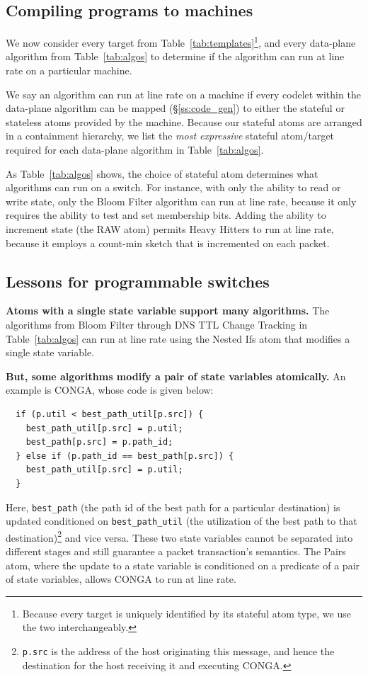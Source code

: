 \subsection{Compiling \pktlanguage programs to \absmachine machines}
\label{ss:compiler}
We now consider every target from Table~\ref{tab:templates}\footnote{Because
every target is uniquely identified by its stateful atom type, we use the two
interchangeably.}, and every data-plane algorithm from Table~\ref{tab:algos} to
determine if the algorithm can run at line rate on a particular \absmachine
machine.

We say an algorithm can run at line rate on a \absmachine machine if every
codelet within the data-plane algorithm can be mapped (\S\ref{ss:code_gen}) to
either the stateful or stateless atoms provided by the \absmachine machine.
Because our stateful atoms are arranged in a containment hierarchy, we list the
\textit{most expressive} stateful atom/target required for each data-plane
algorithm in Table~\ref{tab:algos}.

As Table~\ref{tab:algos} shows, the choice of stateful atom determines
 what algorithms can run on a switch. For instance, with only the
ability to read or write state, only the Bloom Filter algorithm can run at line
rate, because it only requires the ability to test and set membership bits.
Adding the ability to increment state (the RAW atom) permits Heavy
Hitters to run at line rate, because it employs a count-min sketch that is
incremented on each packet.

\subsection{Lessons for programmable switches}
\label{ss:lessons}

\medskip
\noindent
\textbf{Atoms with a single state variable support many algorithms.}
The algorithms from Bloom Filter through DNS TTL Change Tracking
in Table~\ref{tab:algos} can run at line rate using the Nested Ifs atom that
modifies a single state variable.

\medskip
\noindent
\textbf{But, some algorithms modify a pair of state variables atomically.}
An example is CONGA, whose code is given below:
\begin{verbatim}
  if (p.util < best_path_util[p.src]) {
    best_path_util[p.src] = p.util;
    best_path[p.src] = p.path_id;
  } else if (p.path_id == best_path[p.src]) {
    best_path_util[p.src] = p.util;
  }
\end{verbatim}
Here, \texttt{best\_path} (the path id of the best path for a particular
destination) is updated conditioned on \texttt{best\_path\_util} (the
utilization of the best path to that destination)\footnote{{\tt p.src} is the
  address of the host originating this message, and hence the destination for
the host receiving it and executing CONGA.} and vice versa. These two state
variables cannot be separated into different stages and still guarantee a
packet transaction's semantics. The Pairs atom, where the update to a state
variable is conditioned on a predicate of a pair of state variables, allows
CONGA to run at line rate.

